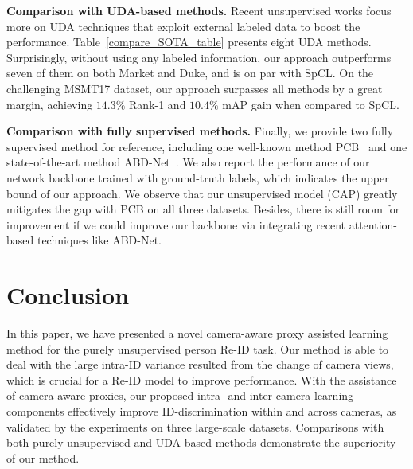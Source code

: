 \documentclass[letterpaper]{article} %
\begin{document}
\textbf{Comparison with UDA-based methods.} %
Recent unsupervised works focus more on UDA techniques that exploit external labeled data to boost the performance. Table~\ref{compare_SOTA_table} presents eight UDA methods. Surprisingly, without using any labeled information, our approach outperforms seven of them on both Market and Duke, and is on par with SpCL. On the challenging MSMT17 dataset, our approach surpasses all methods by a great margin, achieving $14.3\%$ Rank-1 and $10.4\%$ mAP gain when compared to SpCL.  



\textbf{Comparison with fully supervised methods.} Finally, we provide two fully supervised method for reference, including one well-known method PCB~\cite{sun2018beyond} and one state-of-the-art method ABD-Net~\cite{chen2019abd}. We also report the performance of our network backbone trained with ground-truth labels, which indicates the upper bound of our approach. We observe that our unsupervised model (CAP) greatly mitigates the gap with PCB on all three datasets. Besides, there is still room for improvement if we could improve our backbone via integrating recent attention-based techniques like ABD-Net. 



\section{Conclusion}
In this paper, we have presented a novel camera-aware proxy assisted learning method for the purely unsupervised person Re-ID task. Our method is able to deal with the large intra-ID variance resulted from the change of camera views, which is crucial for a Re-ID model to improve performance. With the assistance of camera-aware proxies, our proposed intra- and inter-camera learning components effectively improve ID-discrimination within and across cameras, as validated by the experiments on three large-scale datasets. Comparisons with both purely unsupervised and UDA-based methods demonstrate the superiority of our method.





%

\end{document}
